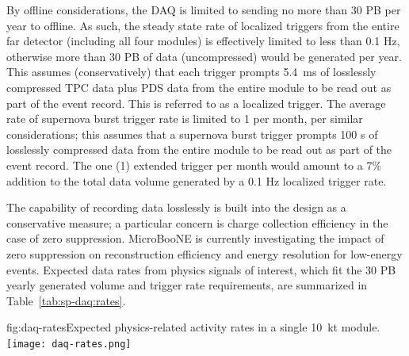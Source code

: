 By offline considerations, the DAQ is limited to sending no more than
30 PB per year to offline. As such, the steady state rate of localized triggers
from the entire far detector (including all four modules) is
effectively limited to less than 0.1 Hz, otherwise
more than 30 PB of data (uncompressed) would be generated per
year. This assumes (conservatively) that each
trigger prompts 5.4~ms of losslessly compressed TPC data plus PDS data from
the entire module to be read out as part of the event record. This is
referred to as a localized trigger. The average rate
of supernova burst trigger rate is limited to 1 per month, per similar
considerations; this assumes that a supernova burst trigger prompts 100 s of losslessly
compressed data from the entire module to be read out as part of the
event record. The one (1) extended trigger per month would amount to a
7\% addition to the total data volume generated by a 0.1 Hz localized
trigger rate.

The capability of recording data losslessly is built
into the design as a conservative measure; a particular concern is
charge collection efficiency in the case of zero
suppression. MicroBooNE is currently investigating the impact of zero
suppression on reconstruction efficiency and energy resolution for
low-energy events. Expected
data rates from physics signals of interest, which fit the 30 PB
yearly generated volume and
trigger rate requirements, are summarized in Table~\ref{tab:sp-daq:rates}.

\begin{dunefigure}{fig:daq-rates}{Expected physics-related activity
    rates in a single \SI{10}{\kilo\tonne} module. \label{sec:fd-daq:rates}
}
  \texttt{[image: daq-rates.png]}
\end{dunefigure}

